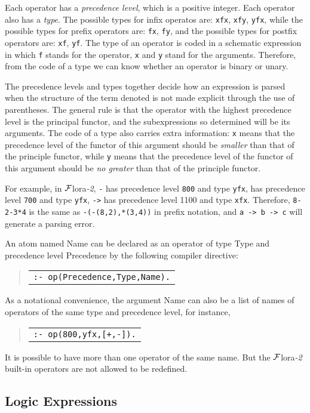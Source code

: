 \documentclass[11pt]{article}
\newenvironment{qrules}{\begin{quote}\sf\begin{tabular}[t]{l}}%
{\end{tabular}\end{quote}}
\newcommand{\FLORA}{{\mbox{${\cal F}${\sc lora}\rm\emph{-2}}}\xspace}
\begin{document}
%
Each operator has a \emph{precedence level}, which is a positive
integer. Each operator also has a \emph{type}. The possible types for
infix operatos are: {\tt xfx}, {\tt xfy}, {\tt yfx}, while the
possible types for prefix operators are: {\tt fx}, {\tt fy}, and the
possible types for postfix operators are: {\tt xf}, {\tt yf}. The type
of an operator is coded in a schematic expression in which {\tt f}
stands for the operator, {\tt x} and {\tt y} stand for the arguments.
Therefore, from the code of a type we can know whether an operator
is binary or unary.

The precedence levels and types together decide how an expression is
parsed when the structure of the term denoted is not made explicit
through the use of parentheses. The general rule is that the operator
with the highest precedence level is the principal functor, and the
subexpressions so determined will be its arguments. The code of a type
also carries extra information: {\tt x} means that the precedence
level of the functor of this argument should be \emph{smaller} than
that of the principle functor, while {\tt y} means that the precedence
level of the functor of this argument should be \emph{no greater} than
that of the principle functor.

For example, in \FLORA, {\tt -} has precedence level {\tt 800} and
type {\tt yfx}, {\tt *} has precedence level {\tt 700} and type
{\tt yfx}, {\tt ->} has precedence level 1100 and type {\tt xfx}.
Therefore, {\tt 8-2-3*4} is the same as {\tt -(-(8,2),*(3,4))} in
prefix notation, and {\tt a -> b -> c} will generate a parsing error.

%
An atom named {\sf Name} can be declared as an operator of type {\sf Type}
and precedence level {\sf Precedence} by the following compiler directive:
\begin{qrules}
{\tt :- op(Precedence,Type,Name).}
\end{qrules}

As a notational convenience, the argument {\sf Name} can also be a list of
names of operators of the same type and precedence level, for instance,
\begin{qrules}
{\tt :- op(800,yfx,[+,-]).}
\end{qrules}

It is possible to have more than one operator of the same name. But the
\FLORA built-in operators are not allowed to be redefined.


\subsection{Logic Expressions}
\end{document}
